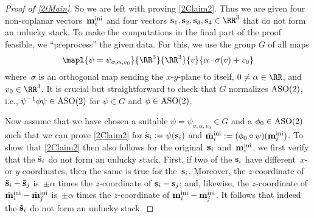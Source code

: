 \documentclass[reqno]{amsart}
\begin{document}
\begin{proof}[Proof of \cref{2tMain}]
  So we are left with proving \cref{2Claim2}. Thus we are given four
  non-coplanar vectors~$\mathbf{m}_i^{\operatorname{ini}}$ and four vectors
  $\ve s_1,\ve s_2,\ve s_3,\ve s_4 \in \RR^3$ that do not form an unlucky stack. To make the computations in the final part of
  the proof feasible, we ``preprocess'' the given data. For this, we
  use the group $G$ of all maps
  \[
    \mapl{\psi = \psi_{\sigma,\alpha,v_0}}{\RR^3}{\RR^3}{v}{\alpha
      \cdot \sigma(v) + v_0}
  \]
  where~$\sigma$ is an orthogonal map sending the $x$-$y$-plane to
  itself, $0 \ne \alpha \in \RR$, and $v_0 \in \RR^3$.  It is crucial
  but straightforward to check that $G$ normalizes $\operatorname{ASO}(2)$, i.e.,
  $\psi^{-1} \phi \psi \in \operatorname{ASO}(2)$ for $\psi \in G$ and
  $\phi \in \operatorname{ASO}(2)$.

  Now assume that we have chosen a suitable
  $\psi = \psi_{\sigma,\alpha,v_0}\in G$ and a $\phi_0 \in \operatorname{ASO}(2)$
  such that we can prove \cref{2Claim2} for
  $\tilde{\mathbf{s}}_i := \psi(\mathbf{s}_i)$ and
  $\tilde{\mathbf{m}}_i^{\operatorname{ini}} := (\phi_0 \circ \psi)(\mathbf{m}_i^{\operatorname{ini}})$. To show
  that \cref{2Claim2} then also follows for the original~$\mathbf{s}_i$
  and~$\mathbf{m}_i^{\operatorname{ini}}$, we first verify that the $\tilde{\mathbf{s}}_i$ do not form an unlucky stack. First, if two of the $\mathbf{s}_i$ have
  different~$x$- or $y$-coordinates, then the same is true for
  the~$\tilde{\mathbf{s}}_i$. Moreover, the $z$-coordinate of
  $\tilde{\mathbf{s}}_i - \tilde{\mathbf{s}}_j$ is~$\pm \alpha$ times the
  $z$-coordinate of $\mathbf{s}_i - \mathbf{s}_j$; and, likewise, the
  $z$-coordinate of $\tilde{\mathbf{m}}_i^{\operatorname{ini}} - \tilde{\mathbf{m}}_j^{\operatorname{ini}}$
  is~$\pm \alpha$ times the $z$-coordinate of
  $\mathbf{m}_i^{\operatorname{ini}} - \mathbf{m}_j^{\operatorname{ini}}$. It follows that indeed the
  $\tilde{\mathbf{s}}_i$ do not form an unlucky stack.


\end{proof}
\end{document}
